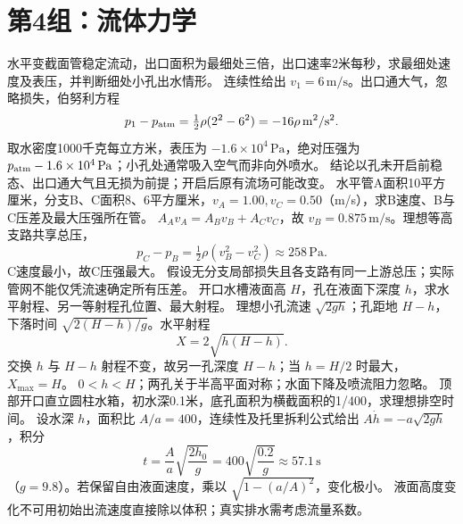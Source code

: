 \section{第4组：流体力学}
\problemtext 水平变截面管稳定流动，出口面积为最细处三倍，出口速率2米每秒，求最细处速度及表压，并判断细处小孔出水情形。
\workings 连续性给出 $v_1=6\,\mathrm{m/s}$。出口通大气，忽略损失，伯努利方程
\[
p_1-p_{\rm atm}=\tfrac12\rho(2^2-6^2)=-16\rho\,\mathrm{m^2/s^2}.
\]
取水密度1000千克每立方米，表压为 $-1.6\times10^4\,\mathrm{Pa}$，绝对压强为 $p_{\rm atm}-1.6\times10^4\,\mathrm{Pa}$；小孔处通常吸入空气而非向外喷水。
\crosscheck 结论以孔未开启前稳态、出口通大气且无损为前提；开启后原有流场可能改变。
\problemtext 水平管A面积10平方厘米，分支B、C面积8、6平方厘米，$v_A=1.00,v_C=0.50$（m/s），求B速度、B与C压差及最大压强所在管。
\workings $A_Av_A=A_Bv_B+A_Cv_C$，故 $v_B=0.875\,\mathrm{m/s}$。理想等高支路共享总压，
\[
p_C-p_B=\tfrac12\rho(v_B^2-v_C^2)\approx258\,\mathrm{Pa}.
\]
C速度最小，故C压强最大。
\crosscheck 假设无分支局部损失且各支路有同一上游总压；实际管网不能仅凭流速确定所有压差。
\problemtext 开口水槽液面高 $H$，孔在液面下深度 $h$，求水平射程、另一等射程孔位置、最大射程。
\workings 理想小孔流速 $\sqrt{2gh}$；孔距地 $H-h$，下落时间 $\sqrt{2(H-h)/g}$。水平射程
\[
X=2\sqrt{h(H-h)}.
\]
交换 $h$ 与 $H-h$ 射程不变，故另一孔深度 $H-h$；当 $h=H/2$ 时最大，$X_{\max}=H$。
\crosscheck $0<h<H$；两孔关于半高平面对称；水面下降及喷流阻力忽略。
\problemtext 顶部开口直立圆柱水箱，初水深0.1米，底孔面积为横截面积的1/400，求理想排空时间。
\workings 设水深 $h$，面积比 $A/a=400$，连续性及托里拆利公式给出 $A\dot h=-a\sqrt{2gh}$，积分
\[
t=\frac{A}{a}\sqrt{\frac{2h_0}{g}}
=400\sqrt{\frac{0.2}{g}}\approx57.1\,\mathrm s
\]
（$g=9.8$）。若保留自由液面速度，乘以 $\sqrt{1-(a/A)^2}$，变化极小。
\crosscheck 液面高度变化不可用初始出流速度直接除以体积；真实排水需考虑流量系数。

